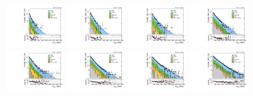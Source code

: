 \begin{figure}[htbp]
  \centering
  \includegraphics[width=0.2\textwidth]{fig/2Dfit/slopesSB_b1_allL_HP_bb_LDy_Run2_mWV_1OverX.pdf}
  \includegraphics[width=0.2\textwidth]{fig/2Dfit/slopesSB_b1_allL_LP_bb_LDy_Run2_mWV_1OverX.pdf}
  \includegraphics[width=0.2\textwidth]{fig/2Dfit/slopesSB_b1_allL_HP_bb_HDy_Run2_mWV_1OverX.pdf}
  \includegraphics[width=0.2\textwidth]{fig/2Dfit/slopesSB_b1_allL_LP_bb_HDy_Run2_mWV_1OverX.pdf}\\
  \includegraphics[width=0.2\textwidth]{fig/2Dfit/slopesSB_b1_allL_HP_nobb_LDy_Run2_mWV_1OverX.pdf}
  \includegraphics[width=0.2\textwidth]{fig/2Dfit/slopesSB_b1_allL_LP_nobb_LDy_Run2_mWV_1OverX.pdf}
  \includegraphics[width=0.2\textwidth]{fig/2Dfit/slopesSB_b1_allL_HP_nobb_HDy_Run2_mWV_1OverX.pdf}
  \includegraphics[width=0.2\textwidth]{fig/2Dfit/slopesSB_b1_allL_LP_nobb_HDy_Run2_mWV_1OverX.pdf}\\

\end{figure}
